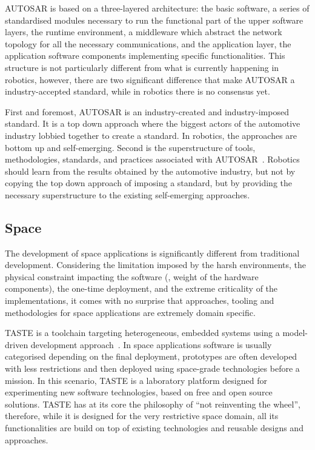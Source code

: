 AUTOSAR is based on a three-layered architecture: the basic software, a series of standardised modules necessary to run the functional part of the upper software layers, the runtime environment, a middleware which abstract the network topology for all the necessary communications, and the application layer, the application software components implementing specific functionalities. This structure is not particularly different from what is currently happening in robotics, however, there are two significant difference that make AUTOSAR a industry-accepted standard, while in robotics there is no consensus yet.

First and foremost, AUTOSAR is an industry-created and in\-dus\-try-imposed standard. It is a top down approach where the biggest actors of the automotive industry lobbied together to create a standard. In robotics, the approaches are bottom up and self-emerging. Second is the superstructure of tools, methodologies, standards, and practices associated with AUTOSAR~\cite{arts2015testing, anssi2011enabling, giese2010model}. Robotics should learn from the results obtained by the automotive industry, but not by copying the top down approach of imposing a standard, but by providing the necessary superstructure to the existing self-emerging approaches.

\subsection{Space}
The development of space applications is significantly different from traditional development. Considering the limitation imposed by the harsh environments, the physical constraint impacting the software (\eg, weight of the hardware components), the one-time deployment, and the extreme criticality of the implementations, it comes with no surprise that approaches, tooling and methodologies for space applications are extremely domain specific.

TASTE is a toolchain targeting heterogeneous, embedded systems using a model-driven development approach~\cite{perrotin2010taste}. In space applications software is usually categorised depending on the final deployment, prototypes are often developed with less restrictions and then deployed using space-grade technologies before a mission. In this scenario, TASTE is a laboratory platform designed for experimenting new software technologies, based on free and open source solutions. TASTE has at its core the philosophy of ``not reinventing the wheel'', therefore, while it is designed for the very restrictive space domain, all its functionalities are build on top of existing technologies and reusable designs and approaches.

